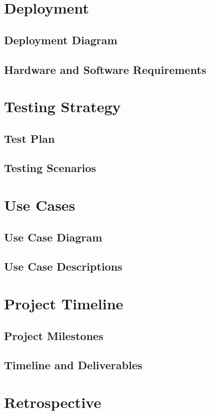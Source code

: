 \documentclass{report}
\begin{document}
\chapter{Deployment}
\section{Deployment Diagram}
\section{Hardware and Software Requirements}

\chapter{Testing Strategy}
\section{Test Plan}
\section{Testing Scenarios}

\chapter{Use Cases}
\section{Use Case Diagram}
\section{Use Case Descriptions}

\chapter{Project Timeline}
\section{Project Milestones}
\section{Timeline and Deliverables}

\chapter{Retrospective}
\end{document}
